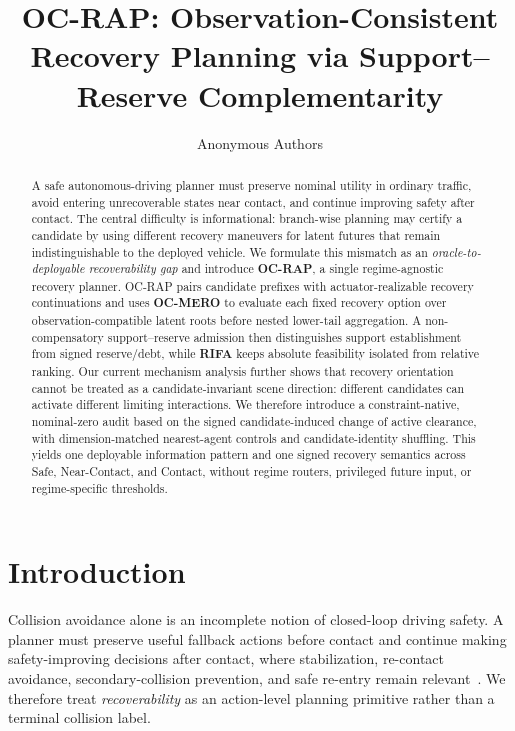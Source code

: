 \documentclass[conference]{IEEEtran}
\title{OC-RAP: Observation-Consistent Recovery Planning via Support--Reserve Complementarity}
\author{Anonymous Authors}
\begin{document}
\maketitle

\begin{abstract}
A safe autonomous-driving planner must preserve nominal utility in ordinary traffic, avoid entering unrecoverable states near contact, and continue improving safety after contact. The central difficulty is informational: branch-wise planning may certify a candidate by using different recovery maneuvers for latent futures that remain indistinguishable to the deployed vehicle. We formulate this mismatch as an \emph{oracle-to-deployable recoverability gap} and introduce \textbf{OC-RAP}, a single regime-agnostic recovery planner. OC-RAP pairs candidate prefixes with actuator-realizable recovery continuations and uses \textbf{OC-MERO} to evaluate each fixed recovery option over observation-compatible latent roots before nested lower-tail aggregation. A non-compensatory support--reserve admission then distinguishes support establishment from signed reserve/debt, while \textbf{RIFA} keeps absolute feasibility isolated from relative ranking. Our current mechanism analysis further shows that recovery orientation cannot be treated as a candidate-invariant scene direction: different candidates can activate different limiting interactions. We therefore introduce a constraint-native, nominal-zero audit based on the signed candidate-induced change of active clearance, with dimension-matched nearest-agent controls and candidate-identity shuffling. This yields one deployable information pattern and one signed recovery semantics across Safe, Near-Contact, and Contact, without regime routers, privileged future input, or regime-specific thresholds.
\end{abstract}

\section{Introduction}
\label{sec:introduction}

Collision avoidance alone is an incomplete notion of closed-loop driving safety. A planner must preserve useful fallback actions before contact and continue making safety-improving decisions after contact, where stabilization, re-contact avoidance, secondary-collision prevention, and safe re-entry remain relevant~\cite{koopman2024anatomy,wang2023integrated,parseh2023motion,wang2024post,yang2025post,ghosh2026post}. We therefore treat \emph{recoverability} as an action-level planning primitive rather than a terminal collision label.
\end{document}
